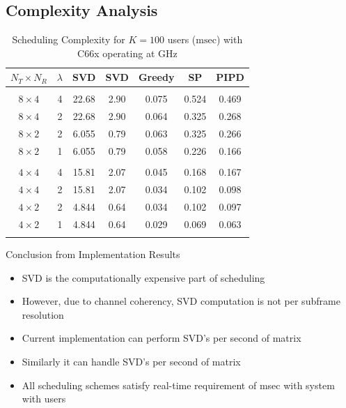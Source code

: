 \documentclass[11pt]{beamer}
\begin{document}
\subsection{Complexity Analysis}

\begin{frame}
\begin{table} \caption{Scheduling Complexity for $K = 100$ users ($\mathrm{msec}$) with C66x operating at GHz} \begin{center} \begin{tabular}{c c c c c c c}
			$N_T \times N_R $ & $\lambda$ & SVD \eqn{(1)} & SVD \eqn{(8)} & Greedy   & SP          & PIPD \\ 
			\hline \\
			$8 \times 4$ & 4 & 22.68 & 2.90 & 0.075 & 0.524 & 0.469 \\ 
			$8 \times 4$ & 2 & 22.68 & 2.90 & 0.064 & 0.325 & 0.268 \\
			$8 \times 2$ & 2 & 6.055 & 0.79 & 0.063 & 0.325 & 0.266 \\
			$8 \times 2$ & 1 & 6.055 & 0.79 & 0.058 & 0.226 & 0.166 \\
			\hline \\
			$4 \times 4$ & 4 & 15.81 & 2.07 & 0.045 & 0.168 & 0.167 \\ 
			$4 \times 4$ & 2 & 15.81 & 2.07 & 0.034 & 0.102 & 0.098 \\
			$4 \times 2$ & 2 & 4.844 & 0.64 & 0.034 & 0.102 & 0.097 \\
			$4 \times 2$ & 1 & 4.844 & 0.64 & 0.029 & 0.069 & 0.063 \\
			\hline \vspace{-0.3in}
		\end{tabular} \label{table:compexity_comparison}\end{center}
\end{table}
\end{frame}

\begin{frame}{Conclusion from Implementation Results}
	\begin{itemize}
		\item SVD is the computationally expensive part of scheduling
		\item However, due to channel coherency, SVD computation is not per subframe resolution
		\item Current implementation can perform  SVD's per second of  matrix
		\item Similarly it can handle  SVD's per second of  matrix
		\item All scheduling schemes satisfy real-time requirement of msec with  system with  users
	\end{itemize}
\end{frame}
\end{document}
